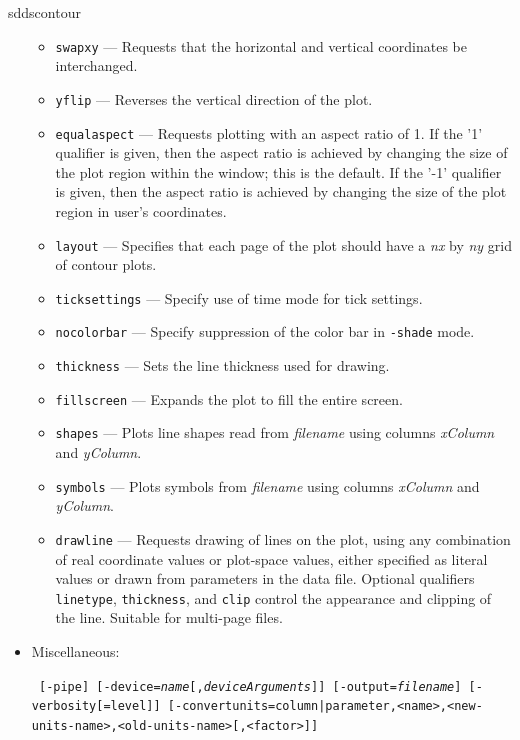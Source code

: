 \begin{sddsprog}{sddscontour}
\begin{itemize}
\begin{itemize}
        \item \verb|swapxy| --- Requests that the horizontal and vertical coordinates be interchanged.
        \item \verb|yflip| --- Reverses the vertical direction of the plot.
        \item \verb|equalaspect| --- Requests plotting with an aspect ratio of 1.  If the '1' qualifier
        is given, then the aspect ratio is achieved by changing the size of the plot region within the window;
        this is the default.
        If the '-1' qualifier is given, then the aspect ratio is achieved by changing the size of the plot region
        in user's coordinates.
        \item \verb|layout| --- Specifies that each page of the plot should have a {\em nx} by {\em ny} grid of contour plots.
        \item \verb|ticksettings| --- Specify use of time mode for tick settings.
        \item \verb|nocolorbar| --- Specify suppression of the color bar in \verb|-shade| mode.
        \item \verb|thickness| --- Sets the line thickness used for drawing.
        \item \verb|fillscreen| --- Expands the plot to fill the entire screen.
        \item \verb|shapes| --- Plots line shapes read from {\em filename} using columns {\em xColumn} and {\em yColumn}.
        \item \verb|symbols| --- Plots symbols from {\em filename} using columns {\em xColumn} and {\em yColumn}.
        \item \verb|drawline| --- Requests drawing of lines on the plot, using any combination of real coordinate values
          or plot-space values, either specified as literal values or drawn from parameters in the data file.
          Optional qualifiers \verb|linetype|, \verb|thickness|, and \verb|clip| control the appearance and clipping of
          the line. Suitable for multi-page files.
        \end{itemize}
    \item Miscellaneous:
\begin{flushleft}{\tt
[-pipe] [-device={\em name}[,{\em deviceArguments}]]
[-output={\em filename}] [-verbosity[=level]]
[-convertunits={column|parameter},<name>,<new-units-name>,<old-units-name>[,<factor>]]
}\end{flushleft}
        \begin{itemize}

\end{itemize}
\end{itemize}
\end{sddsprog}
